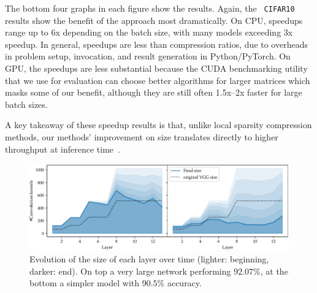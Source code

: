 The bottom four graphs in each figure show the results.  Again, the {\tt
CIFAR10} results show the benefit of the \shrink approach most dramatically.  On
CPU, speedups range up to 6x depending on the batch size, with many models
exceeding 3x speedup. In general, speedups are less than compression ratios, due
to overheads in problem setup, invocation, and result generation  in
Python/PyTorch.  On GPU, the speedups are less substantial because the CUDA
benchmarking utility that we use for evaluation can choose better algorithms for
larger matrices which masks some of our benefit, although they are still often
1.5x--2x faster for large batch sizes.

A key takeaway of these speedup results is that, unlike local sparsity
compression methods, our methods' improvement on size translates directly to
higher throughput at inference time~\cite{Han2015}.

\begin{figure}[htb]
\begin{center}
\vspace{-.1in}
\includegraphics[width=1\columnwidth]{size_evolution}
\vspace*{-5mm} 
\caption{ Evolution of the size of
  each layer over time (lighter: beginning, darker: end). On top a very large
  network performing $92.07\%$, at the bottom a simpler model with $90.5\%$
  accuracy. 
} 
\label{fig:network_size_evolution}
\end{center}
\vspace*{-4mm}
\end{figure}

